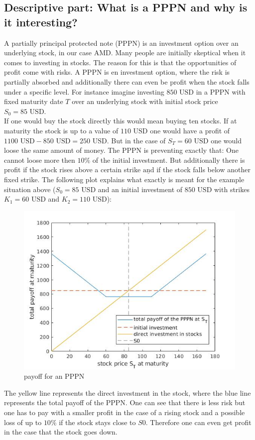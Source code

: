 \documentclass[11pt,oneside,a4paper]{article}
\begin{document}
	\subsection{Descriptive part: What is a PPPN and why is it interesting?}
	A partially principal protected note (PPPN) is an investment option over an underlying stock, in our case AMD. Many people are initially skeptical when it comes to investing in stocks. The reason for this is that the opportunities of profit come with risks. A PPPN is en investment option, where the risk is partially absorbed and additionally there can even be profit when the stock falls under a specific level. For instance imagine investing $850 \text{ USD}$ in a PPPN with fixed maturity date $ T $ over an underlying stock with initial stock price $ S_0 = 85 \text{ USD} $.\\
	 If one would buy the stock directly this would mean buying ten stocks. If at maturity the stock is up to a value of $ 110 \text{ USD} $ one would have a profit of $ 1100 \text{ USD} - 850 \text{ USD} = 250 \text{ USD}  $. But in the case of $ S_T = 60 \text{ USD} $ one would loose the same amount of money.
	 The PPPN is preventing exactly that: One cannot loose more then $ 10 \% $ of the initial investment. But additionally there is profit if the stock rises above a certain strike $\underline{\text{and}}$ if the stock falls below another fixed strike. The following plot explains what exactly is meant for the example situation above ($ S_0 = 85 \text{ USD}$ and an initial investment of $ 850 \text{ USD} $ with strikes $ K_1 = 60\text{ USD} $ and  $ K_2 = 110\text{ USD} $): 
	\begin{figure}[H]
		\centering
		\includegraphics[width=0.6\linewidth]{payoff_PPPN.jpg}
		 \caption{payoff for an PPPN}
	\end{figure} 
	The yellow line represents the direct investment in the stock, where the blue line represents the total payoff of the PPPN. One can see that there is less risk but one has to pay with a smaller profit in the case of a rising stock and a possible loss of up to $ 10 \% $ if the stock stays close to $ S0 $.  Therefore one can even get profit in the case that the stock goes down.
	\newpage
\end{document}

